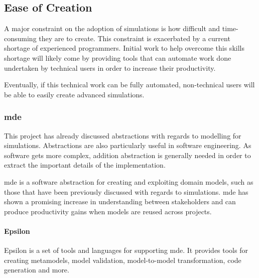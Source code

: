 \documentclass{UoYCSproject}
\begin{document}
\subsection{Ease of Creation}
A major constraint on the adoption of simulations is how difficult and time-consuming they are to create.
This constraint is exacerbated by a current shortage of experienced programmers.
Initial work to help overcome this skills shortage will likely come by providing tools that can automate work done undertaken by technical users in order to increase their productivity.

Eventually, if this technical work can be fully automated, non-technical users will be able to easily create advanced simulations.



\subsubsection{\acrlong{mde}}
This project has already discussed abstractions with regards to modelling for simulations.
Abstractions are also particularly useful in software engineering.
As software gets more complex, addition abstraction is generally needed in order to extract the important details of the implementation\cite[p.24]{csapp}.

\gls{mde} is a software abstraction for creating and exploiting domain models, such as those that have been previously discussed with regards to simulations.
\gls{mde} has shown a promising increase in understanding between stakeholders and can produce productivity gains when models are reused across projects\cite{mde_industry_review}.

\paragraph{Epsilon} Epsilon is a set of tools and languages for supporting \gls{mde}.
It provides tools for creating metamodels, model validation, model-to-model transformation, code generation and more.\cite{epsilon_book}

\end{document}
